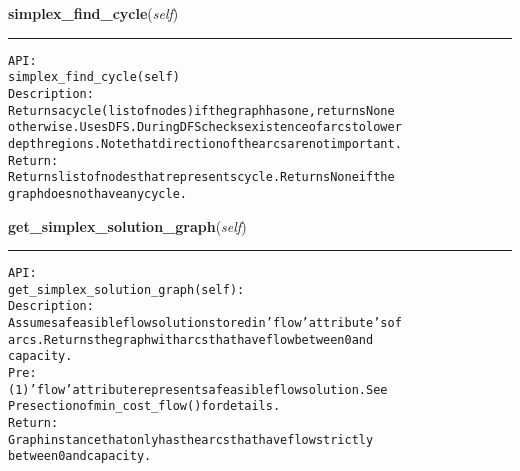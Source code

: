     \label{coinor:gimpy:graph:Graph:simplex_find_cycle}

    \vspace{0.5ex}

\hspace{.8\funcindent}\begin{boxedminipage}{\funcwidth}

    \raggedright \textbf{simplex\_find\_cycle}(\textit{self})

    \vspace{-1.5ex}

    \rule{\textwidth}{0.5\fboxrule}
\setlength{\parskip}{2ex}
\begin{alltt}

API:
    simplex\_find\_cycle(self)
Description:
    Returns a cycle (list of nodes) if the graph has one, returns None
    otherwise. Uses DFS. During DFS checks existence of arcs to lower
    depth regions. Note that direction of the arcs are not important.
Return:
    Returns list of nodes that represents cycle. Returns None if the
    graph does not have any cycle.
\end{alltt}

\setlength{\parskip}{1ex}
    \end{boxedminipage}

    \label{coinor:gimpy:graph:Graph:get_simplex_solution_graph}

    \vspace{0.5ex}

\hspace{.8\funcindent}\begin{boxedminipage}{\funcwidth}

    \raggedright \textbf{get\_simplex\_solution\_graph}(\textit{self})

    \vspace{-1.5ex}

    \rule{\textwidth}{0.5\fboxrule}
\setlength{\parskip}{2ex}
\begin{alltt}

API:
    get\_simplex\_solution\_graph(self):
Description:
    Assumes a feasible flow solution stored in 'flow' attribute's of
    arcs. Returns the graph with arcs that have flow between 0 and
    capacity.
Pre:
    (1) 'flow' attribute represents a feasible flow solution. See
    Pre section of min\_cost\_flow() for details.
Return:
    Graph instance that only has the arcs that have flow strictly
    between 0 and capacity.
\end{alltt}

\setlength{\parskip}{1ex}
    \end{boxedminipage}

